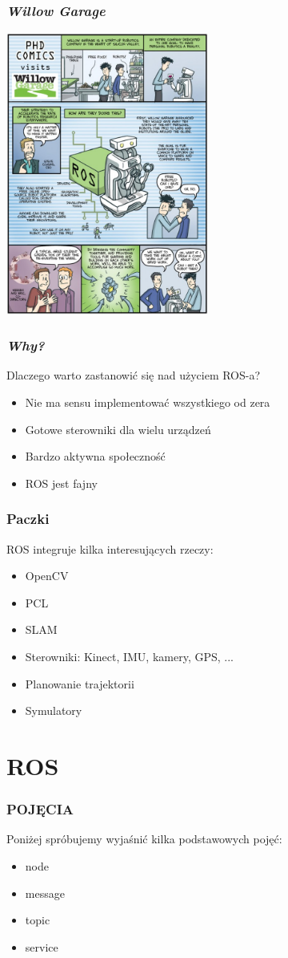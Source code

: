\documentclass[12pt,a4paper,portrait]{beamer}
\begin{document}
\begin{frame}
\frametitle{\textit{Willow Garage}}
\begin{center}
\includegraphics[width=0.5\textwidth]{pics/comic2.jpg}
\end{center}
\end{frame}


\begin{frame}
\frametitle{\textit{Why?}}
Dlaczego warto zastanowić się nad użyciem ROS-a?
\begin{itemize}
\item Nie ma sensu implementować wszystkiego od zera
\item Gotowe sterowniki dla wielu urządzeń
\item Bardzo aktywna społeczność
\item ROS jest fajny
\end{itemize}
\end{frame}


\begin{frame}
\frametitle{Paczki}
ROS integruje kilka interesujących rzeczy:
\begin{itemize}
\item OpenCV
\item PCL
\item SLAM
\item Sterowniki: Kinect, IMU, kamery, GPS, ...
\item Planowanie trajektorii
\item Symulatory
\end{itemize}
\end{frame}



\section{ROS}
\begin{frame}
\frametitle{POJĘCIA}
Poniżej spróbujemy wyjaśnić kilka podstawowych pojęć:
\begin{itemize}
\item node
\item message
\item topic
\item service
\end{itemize}
\end{frame}
\end{document}
